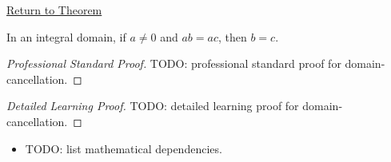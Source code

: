 \newpage
{}
\label{prf:domain-cancellation}

\begin{remark*}[Return]
\hyperref[prop:domain-cancellation]{Return to Theorem}
\end{remark*}

\begin{proposition*}
In an integral domain, if $a\neq 0$ and $ab=ac$, then $b=c$.
\end{proposition*}

\begin{proof}[Professional Standard Proof]
\LRAProofBodyStart
TODO: professional standard proof for domain-cancellation.
\end{proof}

\begin{proof}[Detailed Learning Proof]
\LRAProofBodyStart
TODO: detailed learning proof for domain-cancellation.
\end{proof}

\begin{remark*}
\end{remark*}

\begin{dependencies}
\begin{itemize}
  \item TODO: list mathematical dependencies.
\end{itemize}
\end{dependencies}

\clearpage
